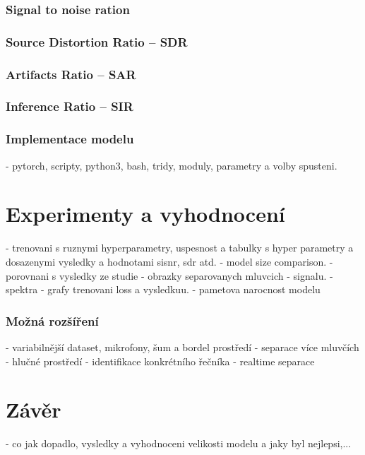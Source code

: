 \subsection{Signal to noise ration}
\subsection*{Source Distortion Ratio -- SDR}
\subsection*{Artifacts Ratio -- SAR}
\subsection*{Inference Ratio -- SIR}

\subsection{Implementace modelu}
- pytorch, scripty, python3, bash, tridy, moduly, parametry a volby spusteni.



\chapter{Experimenty a vyhodnocení}
\label{experimenty}
- trenovani s ruznymi hyperparametry, uspesnost a tabulky s hyper parametry a dosazenymi vysledky a hodnotami sisnr, sdr atd.
- model size comparison.
- porovnani s vysledky ze studie
- obrazky separovanych mluvcich - signalu.
- spektra
- grafy trenovani loss a vysledkuu.
- pametova narocnost modelu


\subsection{Možná rozšíření}
- variabilnější dataset, mikrofony, šum a bordel prostředí
- separace více mluvčích
- hlučné prostředí
- identifikace konkrétního řečníka
- realtime separace

\chapter{Závěr}
\label{zaver}
- co jak dopadlo, vysledky a vyhodnoceni velikosti modelu a jaky byl nejlepsi,...
\blindtext[3]
